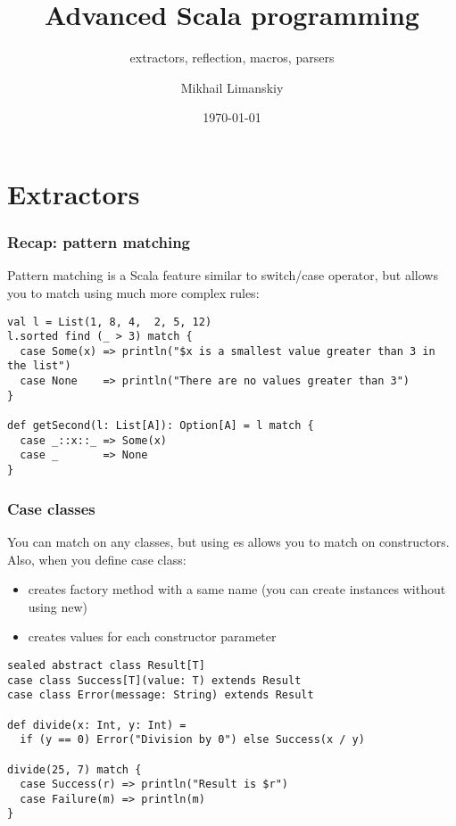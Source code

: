 \documentclass{beamer}
\title{Advanced Scala programming}
\subtitle{extractors, reflection, macros, parsers}
\author{Mikhail Limanskiy}
\institute{SymphonyTeleca}
\date{\today}
\begin{document}
\begin{frame}
    \titlepage
\end{frame}

\section{Extractors}

\begin{frame}[fragile]
\frametitle{Recap: pattern matching}
Pattern matching is a Scala feature similar to switch/case operator, but allows you to match
using much more complex rules:
\begin{example}
\begin{lstlisting}
val l = List(1, 8, 4,  2, 5, 12)
l.sorted find (_ > 3) match {
  case Some(x) => println("$x is a smallest value greater than 3 in the list")
  case None    => println("There are no values greater than 3")
}

def getSecond(l: List[A]): Option[A] = l match {
  case _::x::_ => Some(x)
  case _       => None
}
\end{lstlisting}
\end{example}
\end{frame}

\begin{frame}[fragile]
\frametitle{Case classes}
You can match on any classes, but using es allows you to match on constructors.
Also, when you define case class:
\begin{itemize}
\item creates factory method with a same name (you can create instances without using new)
\item creates values for each constructor parameter
\end{itemize}
\begin{example}
\begin{lstlisting}
sealed abstract class Result[T]
case class Success[T](value: T) extends Result
case class Error(message: String) extends Result

def divide(x: Int, y: Int) = 
  if (y == 0) Error("Division by 0") else Success(x / y)

divide(25, 7) match {
  case Success(r) => println("Result is $r")
  case Failure(m) => println(m)
}
\end{lstlisting}
\end{example}
\end{frame}
\end{document}
